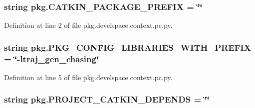 \subsubsection[{\texorpdfstring{C\+A\+T\+K\+I\+N\+\_\+\+P\+A\+C\+K\+A\+G\+E\+\_\+\+P\+R\+E\+F\+IX}{CATKIN_PACKAGE_PREFIX}}]{\setlength{\rightskip}{0pt plus 5cm}string pkg.\+C\+A\+T\+K\+I\+N\+\_\+\+P\+A\+C\+K\+A\+G\+E\+\_\+\+P\+R\+E\+F\+IX = \char`\"{}\char`\"{}}\hypertarget{namespacepkg_ae26c7a5a06b7d738f4d210ca449e6bee}{}\label{namespacepkg_ae26c7a5a06b7d738f4d210ca449e6bee}


Definition at line 2 of file pkg.\+develspace.\+context.\+pc.\+py.

\subsubsection[{\texorpdfstring{P\+K\+G\+\_\+\+C\+O\+N\+F\+I\+G\+\_\+\+L\+I\+B\+R\+A\+R\+I\+E\+S\+\_\+\+W\+I\+T\+H\+\_\+\+P\+R\+E\+F\+IX}{PKG_CONFIG_LIBRARIES_WITH_PREFIX}}]{\setlength{\rightskip}{0pt plus 5cm}string pkg.\+P\+K\+G\+\_\+\+C\+O\+N\+F\+I\+G\+\_\+\+L\+I\+B\+R\+A\+R\+I\+E\+S\+\_\+\+W\+I\+T\+H\+\_\+\+P\+R\+E\+F\+IX = \char`\"{}-\/ltraj\+\_\+gen\+\_\+chasing\char`\"{}}\hypertarget{namespacepkg_a433e30cecb4a0123a7c4b384d168e336}{}\label{namespacepkg_a433e30cecb4a0123a7c4b384d168e336}


Definition at line 5 of file pkg.\+develspace.\+context.\+pc.\+py.

\subsubsection[{\texorpdfstring{P\+R\+O\+J\+E\+C\+T\+\_\+\+C\+A\+T\+K\+I\+N\+\_\+\+D\+E\+P\+E\+N\+DS}{PROJECT_CATKIN_DEPENDS}}]{\setlength{\rightskip}{0pt plus 5cm}string pkg.\+P\+R\+O\+J\+E\+C\+T\+\_\+\+C\+A\+T\+K\+I\+N\+\_\+\+D\+E\+P\+E\+N\+DS = \char`\"{}\char`\"{}}\hypertarget{namespacepkg_a17c18447fad253ee1c0d76deec88028c}{}\label{namespacepkg_a17c18447fad253ee1c0d76deec88028c}


